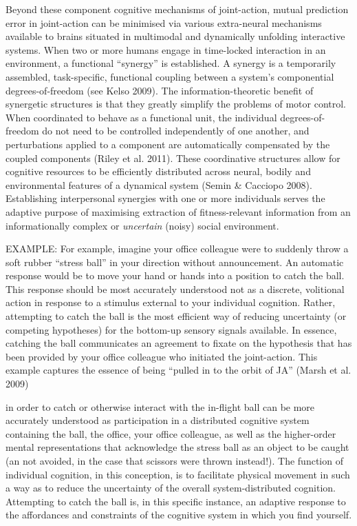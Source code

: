           Beyond these component cognitive mechanisms of joint-action, mutual prediction error in joint-action can be minimised via various extra-neural mechanisms available to brains situated in multimodal and dynamically unfolding interactive systems.  When two or more humans engage in time-locked interaction in an environment, a functional ``synergy'' is established.  A synergy is a temporarily assembled, task-specific, functional coupling between a system’s componential degrees-of-freedom (see Kelso 2009).  The information-theoretic benefit of synergetic structures is that they greatly simplify the problems of motor control. When coordinated to behave as a functional unit, the individual degrees-of-freedom do not need to be controlled independently of one another, and perturbations applied to a component are automatically compensated by the coupled components (Riley et al. 2011). These coordinative structures allow for cognitive resources to be efficiently distributed across neural, bodily and environmental features of a dynamical system (Semin & Cacciopo 2008).  Establishing interpersonal synergies with one or more individuals serves the adaptive purpose of maximising extraction of fitness-relevant information from an informationally complex or \textit{uncertain} (noisy) social environment.



          EXAMPLE:
          For example, imagine your office colleague were to suddenly throw a soft rubber ``stress ball'' in your direction without announcement. An automatic response would be to move your hand or hands into a position to catch the ball.  This response should be most accurately understood not as a discrete, volitional action in response to a stimulus external to your individual cognition. Rather, attempting to catch the ball is the most efficient way of reducing uncertainty (or competing hypotheses) for the bottom-up sensory signals available.  In essence, catching the ball communicates an agreement to fixate on the hypothesis that has been provided by your office colleague who initiated the joint-action.  This example captures the essence of being ``pulled in to the orbit of JA'' (Marsh et al. 2009)

          in order to catch or otherwise interact with the in-flight ball can be more accurately understood as participation in a distributed cognitive system containing the ball, the office, your office colleague, as well as the higher-order mental representations that acknowledge the stress ball as an object to be caught (an not avoided, in the case that scissors were thrown instead!). The function of individual cognition, in this conception, is to facilitate physical movement in such a way as to reduce the uncertainty of the overall system-distributed cognition.  Attempting to catch the ball is, in this specific instance, an adaptive response to the affordances and constraints of the cognitive system in which you find yourself.



